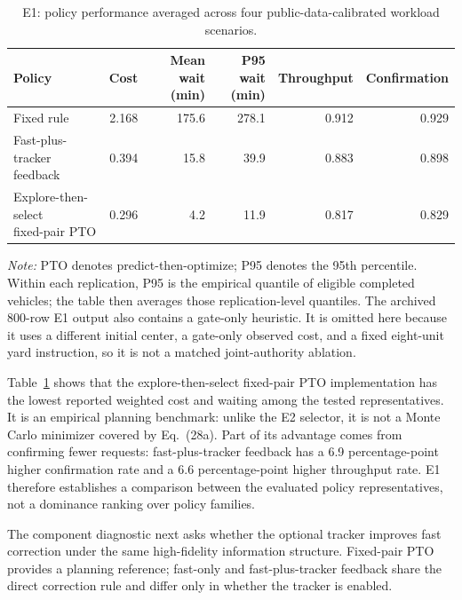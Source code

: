 \documentclass[preprint,12pt,authoryear,a4paper]{elsarticle}
\begin{document}
\begin{table}[htbp]
\centering
\caption{E1: policy performance averaged across four public-data-calibrated workload scenarios.}
\label{tab:e1-main-results}
\footnotesize
\begin{tabular*}{\textwidth}{@{\extracolsep{\fill}}lrrrrr@{}}
\toprule
Policy & Cost & \makecell[r]{Mean wait\\(min)} & \makecell[r]{P95 wait\\(min)} & Throughput & Confirmation \\
\midrule
Fixed rule           & 2.168 & 175.6 & 278.1 & 0.912 & 0.929 \\
\makecell[l]{Fast-plus-tracker\\feedback} & 0.394 &  15.8 &  39.9 & 0.883 & 0.898 \\
\makecell[l]{Explore-then-select\\fixed-pair PTO} & 0.296 &   4.2 &  11.9 & 0.817 & 0.829 \\
\bottomrule
\end{tabular*}
\begin{minipage}{\textwidth}
\footnotesize\raggedright
\textit{Note:} PTO denotes predict-then-optimize; P95 denotes the 95th percentile. Within each replication, P95 is the empirical quantile of eligible completed vehicles; the table then averages those replication-level quantiles. The archived 800-row E1 output also contains a gate-only heuristic. It is omitted here because it uses a different initial center, a gate-only observed cost, and a fixed eight-unit yard instruction, so it is not a matched joint-authority ablation.
\end{minipage}
\end{table}

Table~\ref{tab:e1-main-results} shows that the explore-then-select fixed-pair PTO implementation has the lowest reported weighted cost and waiting among the tested representatives. It is an empirical planning benchmark: unlike the E2 selector, it is not a Monte Carlo minimizer covered by Eq.~(28a). Part of its advantage comes from confirming fewer requests: fast-plus-tracker feedback has a 6.9 percentage-point higher confirmation rate and a 6.6 percentage-point higher throughput rate. E1 therefore establishes a comparison between the evaluated policy representatives, not a dominance ranking over policy families.

The component diagnostic next asks whether the optional tracker improves fast correction under the same high-fidelity information structure. Fixed-pair PTO provides a planning reference; fast-only and fast-plus-tracker feedback share the direct correction rule and differ only in whether the tracker is enabled.
\end{document}

